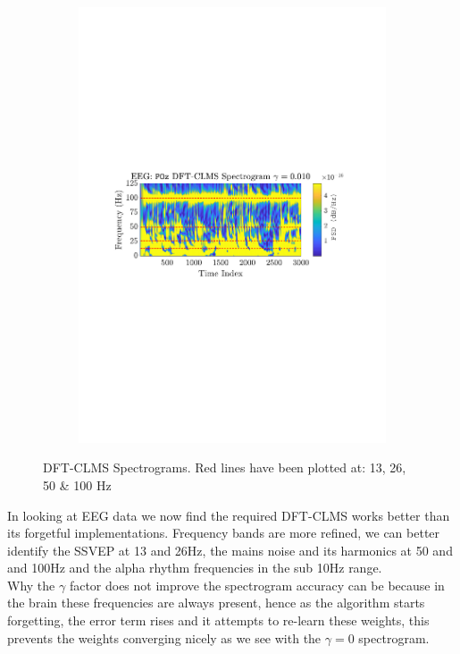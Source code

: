 \documentclass[12pt]{article}
\begin{document}
\begin{figure}[H]
\begin{subfigure}{0.49\textwidth}
					\includegraphics[trim={2.2cm 11.2cm 2.90cm  11.2cm}, clip, width=\textwidth]{../MATLAB/figures/q3_3d_fig04.pdf} 
					\captionsetup{justification=centering}
				\end{subfigure}
				
				\captionsetup{justification=centering}
				\caption{DFT-CLMS Spectrograms. Red lines have been plotted at: 13, 26, 50 \& 100 Hz }
				\label{fig: 3-3d}
			\end{figure}
			
			In looking at EEG data we now find the required DFT-CLMS works better than its forgetful implementations. Frequency bands are more refined, we can better identify the SSVEP at 13 and 26Hz, the mains noise and its harmonics at 50 and and 100Hz and the alpha rhythm frequencies in the sub 10Hz range.\\
			Why the $\gamma$ factor does not improve the spectrogram accuracy can be because in the brain these frequencies are always present, hence as the algorithm starts forgetting, the error term rises and it attempts to re-learn these weights, this prevents the weights converging nicely as we see with the $\gamma=0$ spectrogram.
	
\end{document}

